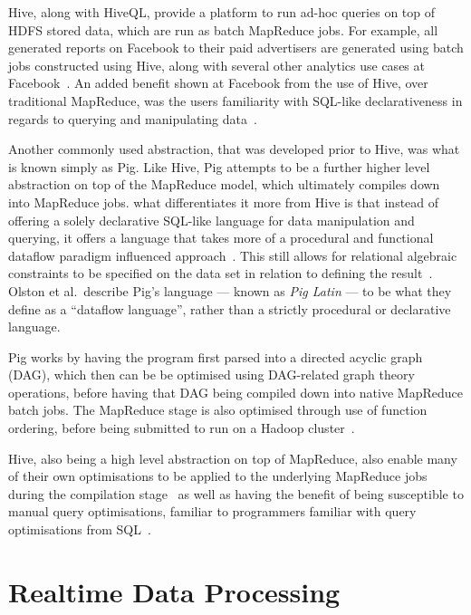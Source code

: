 Hive, along with HiveQL, provide a platform to run ad-hoc queries on top of HDFS stored data, which are run as batch
MapReduce jobs. For example, all generated reports on Facebook to their paid advertisers are generated using batch jobs
constructed using Hive, along with several other analytics use cases at Facebook~\cite{thusoo2010data}. An added benefit
shown at Facebook from the use of Hive, over traditional MapReduce, was the users familiarity with SQL-like
declarativeness in regards to querying and manipulating data~\cite{borthakur2011apache}.

Another commonly used abstraction, that was developed prior to Hive, was what is known simply as Pig. Like Hive, Pig attempts to
be a further higher level abstraction on top of the MapReduce model, which ultimately compiles down into MapReduce jobs.
what differentiates it more from Hive is that instead of offering a solely declarative SQL-like language for data
manipulation and querying, it offers a language that takes more of a procedural and functional dataflow paradigm
influenced approach~\cite{olston2011nova}. This still allows for relational algebraic constraints to be specified on the data set in relation to defining the
result~\cite{olston_pig_2008}. Olston et al.\ describe Pig's language --- known as \textit{Pig Latin} --- to be what they
define as a ``dataflow language'', rather than a strictly procedural or declarative language.

Pig works by having the program first parsed into a directed acyclic graph (DAG), which then can be be optimised using
DAG-related graph theory operations, before having that DAG being compiled down into native MapReduce batch jobs. The MapReduce
stage is also optimised through use of function ordering, before being submitted to run on a Hadoop
cluster~\cite{stewart2011comparing}.

Hive, also being a high level abstraction on top of MapReduce, also enable many of their own
optimisations to be applied to the underlying MapReduce jobs during the compilation
stage~\cite{gates2009building,thusoo2010hive} as well as having the benefit of being susceptible to manual query
optimisations, familiar to programmers familiar with query optimisations from SQL~\cite{gruenheid2011query}.






\section{Realtime Data Processing} %
\label{sub:realtime_data_processing}

